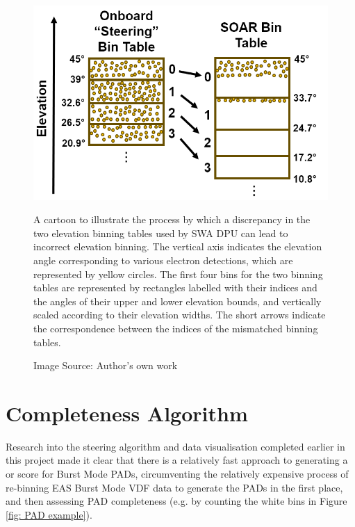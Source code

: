 \begin{figure}[h!]
    \centering
    \centerfloat
    \includegraphics[width=0.75\linewidth]{figures/bin issue cartoon.png}
    \caption{A cartoon to illustrate the process by which a discrepancy in the two elevation binning tables used by SWA DPU can lead to incorrect elevation binning. The vertical axis indicates the elevation angle corresponding to various electron detections, which are represented by yellow circles. The first four bins for the two binning tables are represented by rectangles labelled with their indices and the angles of their upper and lower elevation bounds, and vertically scaled according to their elevation widths. The short arrows indicate the correspondence between the indices of the mismatched binning tables.}
    \caption*{Image Source: Author's own work}
    \label{fig: bin issue cartoon}
\end{figure}

\newpage
\section{Completeness Algorithm} \label{completeness}
Research into the steering algorithm and data visualisation completed earlier in this project made it clear that there is a relatively fast approach to generating a  or  score for Burst Mode PADs, circumventing the relatively expensive process of re-binning EAS Burst Mode VDF data to generate the PADs in the first place, and then assessing PAD completeness  (e.g. by counting the white bins in Figure \ref{fig: PAD example}).
\\

